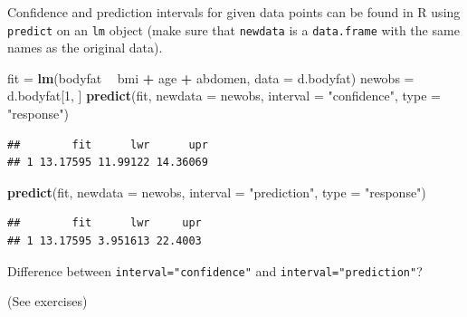 \documentclass[10pt,ignorenonframetext,]{beamer}
\newenvironment{Shaded}{\begin{snugshade}}{\end{snugshade}}
\newcommand{\KeywordTok}[1]{\textcolor[rgb]{0.13,0.29,0.53}{\textbf{#1}}}
\newcommand{\DataTypeTok}[1]{\textcolor[rgb]{0.13,0.29,0.53}{#1}}
\newcommand{\DecValTok}[1]{\textcolor[rgb]{0.00,0.00,0.81}{#1}}
\newcommand{\StringTok}[1]{\textcolor[rgb]{0.31,0.60,0.02}{#1}}
\newcommand{\OperatorTok}[1]{\textcolor[rgb]{0.81,0.36,0.00}{\textbf{#1}}}
\newcommand{\NormalTok}[1]{#1}
\begin{document}
\begin{frame}[fragile]

Confidence and prediction intervals for given data points can be found
in R using \texttt{predict} on an \texttt{lm} object (make sure that
\texttt{newdata} is a \texttt{data.frame} with the same names as the
original data).

\scriptsize

\begin{Shaded}
\begin{Highlighting}[]
\NormalTok{fit =}\StringTok{ }\KeywordTok{lm}\NormalTok{(bodyfat }\OperatorTok{~}\StringTok{ }\NormalTok{bmi }\OperatorTok{+}\StringTok{ }\NormalTok{age }\OperatorTok{+}\StringTok{ }\NormalTok{abdomen, }\DataTypeTok{data =}\NormalTok{ d.bodyfat)}
\NormalTok{newobs =}\StringTok{ }\NormalTok{d.bodyfat[}\DecValTok{1}\NormalTok{, ]}
\KeywordTok{predict}\NormalTok{(fit, }\DataTypeTok{newdata =}\NormalTok{ newobs, }\DataTypeTok{interval =} \StringTok{"confidence"}\NormalTok{, }\DataTypeTok{type =} \StringTok{"response"}\NormalTok{)}
\end{Highlighting}
\end{Shaded}

\begin{verbatim}
##        fit      lwr      upr
## 1 13.17595 11.99122 14.36069
\end{verbatim}

\begin{Shaded}
\begin{Highlighting}[]
\KeywordTok{predict}\NormalTok{(fit, }\DataTypeTok{newdata =}\NormalTok{ newobs, }\DataTypeTok{interval =} \StringTok{"prediction"}\NormalTok{, }\DataTypeTok{type =} \StringTok{"response"}\NormalTok{)}
\end{Highlighting}
\end{Shaded}

\begin{verbatim}
##        fit      lwr     upr
## 1 13.17595 3.951613 22.4003
\end{verbatim}

\normalsize
Difference between \texttt{interval="confidence"} and
\texttt{interval="prediction"}?

(See exercises)

\end{frame}
\end{document}
